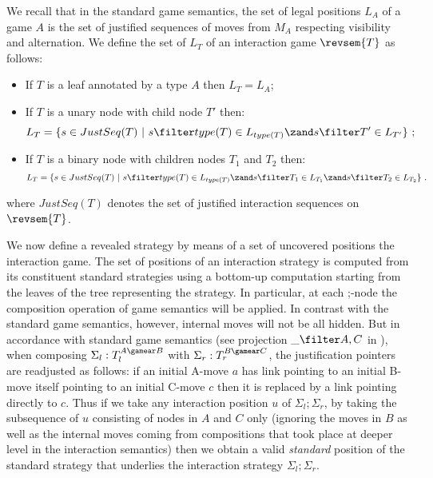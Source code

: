 \begin{definition} We recall
that in the standard game semantics, the set of legal positions
$L_A$ of a game $A$ is the set of justified sequences of moves from
$M_A$ respecting visibility and alternation. We define the set of
 $L_T$ of an interaction game $\revsem{T}$ as
follows:
    \begin{itemize}
    \item If $T$ is a leaf annotated by a type $A$ then $L_T =
    L_A$;
    \item If $T$ is a unary node with child node $T'$ then:
    $$L_T = \{ s \in JustSeq(T) \ | \ s \filter type(T) \in L_{type(T)} \zand  s \filter T' \in L_{T'} \} \ ;$$
    \item If $T$ is a binary node with children nodes $T_1$ and $T_2$ then:
    $$L_T = \{ s \in JustSeq(T) \ | \ s \filter type(T) \in L_{type(T)} \zand  s \filter T_1 \in L_{T_1}
    \zand  s \filter T_2 \in L_{T_2} \} \ .$$
    \end{itemize}
    where $JustSeq(T)$ denotes the set of justified interaction sequences on
    $\revsem{T}$.
\end{definition}


We now define a revealed strategy by means of a set of uncovered positions the interaction game.
The set of positions of an interaction strategy is computed from its constituent standard strategies using a bottom-up computation starting from the leaves of the tree representing the strategy. In particular, at each ;-node the composition operation of game semantics will be applied. In contrast with the standard game semantics, however, internal moves will not be all hidden. But in accordance with standard game semantics (see projection $\_ \filter A,C$ in \cite{abramsky:game-semantics-tutorial}), when composing $\Sigma_l:T_l^{A\gamear B}$ with $\Sigma_r:T_r^{B\gamear C}$, the justification pointers are readjusted as follows: if an initial A-move $a$ has link pointing to an initial B-move itself pointing to an initial C-move $c$ then it is replaced by a link pointing directly to $c$. Thus if we take any interaction position $u$ of $\Sigma_l ; \Sigma_r$, by taking the subsequence of $u$ consisting of nodes in $A$ and $C$ only (ignoring the moves in $B$ as well as the internal moves coming from compositions that took place at deeper level in the interaction semantics) then we obtain a valid \emph{standard} position of the standard strategy that underlies the interaction strategy $\Sigma_l ; \Sigma_r$.

